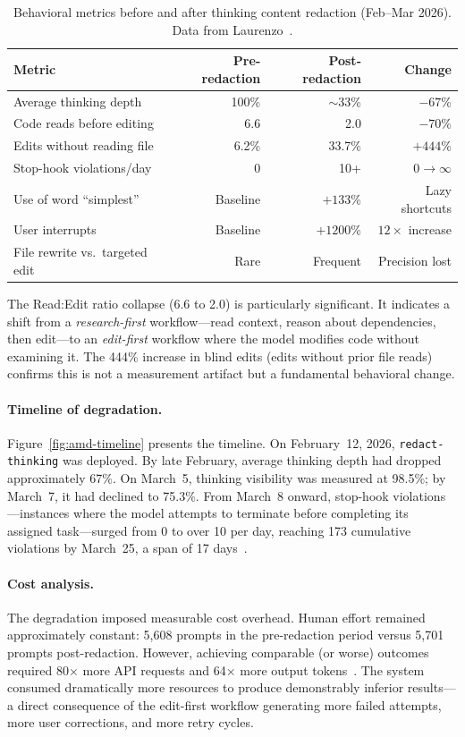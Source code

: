 \begin{table}[h]
\centering
\caption{Behavioral metrics before and after thinking content redaction (Feb--Mar 2026). Data from Laurenzo~\cite{laurenzo2026amd}.}
\label{tab:amd-metrics}
\begin{tabular}{lrrr}
\toprule
Metric & Pre-redaction & Post-redaction & Change \\
\midrule
Average thinking depth & 100\% & $\sim$33\% & $-67$\% \\
Code reads before editing & 6.6 & 2.0 & $-70$\% \\
Edits without reading file & 6.2\% & 33.7\% & $+444$\% \\
Stop-hook violations/day & 0 & 10+ & $0 \to \infty$ \\
Use of word ``simplest'' & Baseline & $+133$\% & Lazy shortcuts \\
User interrupts & Baseline & $+1200$\% & $12\times$ increase \\
File rewrite vs.\ targeted edit & Rare & Frequent & Precision lost \\
\bottomrule
\end{tabular}
\end{table}

The Read:Edit ratio collapse (6.6 to 2.0) is particularly significant.
It indicates a shift from a \emph{research-first} workflow---read context, reason about dependencies, then edit---to an \emph{edit-first} workflow where the model modifies code without examining it.
The 444\% increase in blind edits (edits without prior file reads) confirms this is not a measurement artifact but a fundamental behavioral change.

\paragraph{Timeline of degradation.}
Figure~\ref{fig:amd-timeline} presents the timeline.
On February~12, 2026, \texttt{redact-thinking} was deployed.
By late February, average thinking depth had dropped approximately 67\%.
On March~5, thinking visibility was measured at 98.5\%; by March~7, it had declined to 75.3\%.
From March~8 onward, stop-hook violations---instances where the model attempts to terminate before completing its assigned task---surged from 0 to over 10 per day, reaching 173 cumulative violations by March~25, a span of 17 days~\cite{laurenzo2026amd,laurenzo2026gist}.



\paragraph{Cost analysis.}
The degradation imposed measurable cost overhead.
Human effort remained approximately constant: 5,608 prompts in the pre-redaction period versus 5,701 prompts post-redaction.
However, achieving comparable (or worse) outcomes required 80$\times$ more API requests and 64$\times$ more output tokens~\cite{laurenzo2026amd}.
The system consumed dramatically more resources to produce demonstrably inferior results---a direct consequence of the edit-first workflow generating more failed attempts, more user corrections, and more retry cycles.

